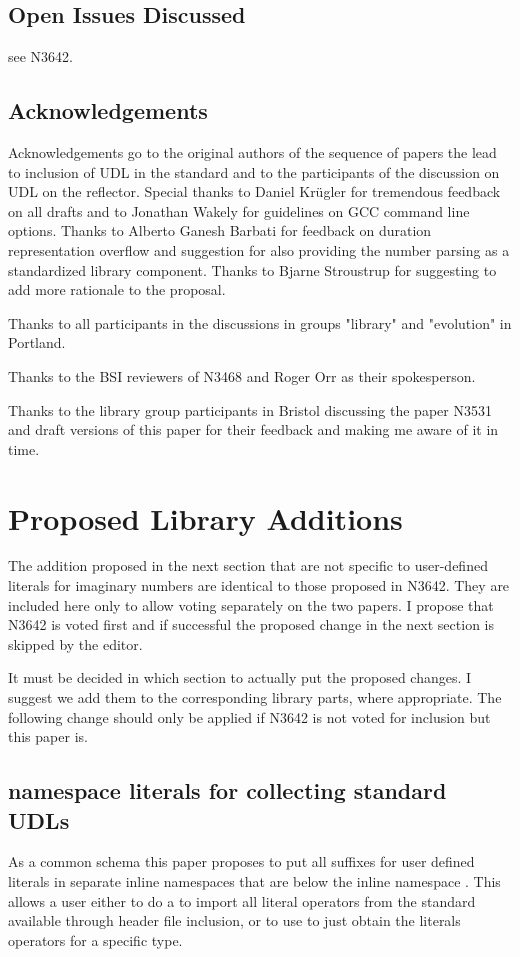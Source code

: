 \documentclass[ebook,11pt,article]{memoir}
\begin{document}
\section{Open Issues Discussed}
see N3642.

\section{Acknowledgements}
Acknowledgements go to the original authors of the sequence of papers the lead to inclusion of UDL in the standard and to the participants of the discussion on UDL on the reflector. Special thanks to Daniel Kr\"ugler for tremendous feedback on all drafts and to Jonathan Wakely for guidelines on GCC command line options. Thanks to Alberto Ganesh Barbati for feedback on duration representation overflow and suggestion for also providing the number parsing as a standardized library component. Thanks to Bjarne Stroustrup for suggesting to add more rationale to the proposal.

Thanks to all participants in the discussions in groups "library" and "evolution" in Portland.

Thanks to the BSI reviewers of N3468 and Roger Orr as their spokesperson.

Thanks to the library group participants in Bristol discussing the paper N3531 and draft versions of this paper for their feedback and making me aware of it in time.

\chapter{Proposed Library Additions}
The addition proposed in the next section that are not specific to user-defined literals for imaginary numbers are identical to those proposed in N3642. They are included here only to allow voting separately on the two papers. I propose that N3642 is voted first and if successful the proposed change in the next section is skipped by the editor.

It must be decided in which section to actually put the proposed changes. I suggest we add them to the corresponding library parts, where appropriate. The following change should only be applied if N3642 is not voted for inclusion but this paper is.



\section{namespace literals for collecting standard UDLs}
As a common schema this paper proposes to put all suffixes for user defined literals in separate inline namespaces that are below the inline namespace . 
\enternote
This allows a user either to do a  to import all literal operators from the standard available through header file inclusion, or to use  to just obtain the literals operators for a specific type.
\exitnote
\end{document}
